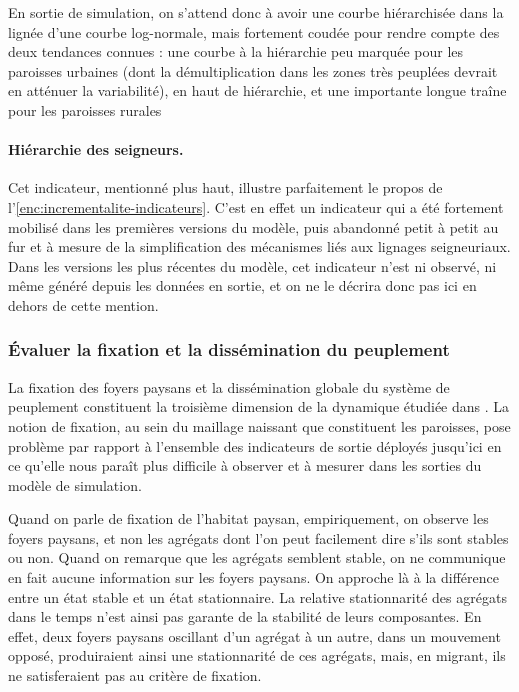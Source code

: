 En sortie de simulation, on s'attend donc à avoir une courbe hiérarchisée dans la lignée d'une courbe log-normale, mais fortement \og coudée\fg{} pour rendre compte des deux tendances connues :
	une courbe à la hiérarchie peu marquée pour les paroisses urbaines (dont la démultiplication dans les zones très peuplées devrait en atténuer la variabilité), en haut de hiérarchie, et une importante \og longue traîne\fg{} pour les paroisses \og rurales\fg{}

\paragraph{Hiérarchie des seigneurs.}
Cet indicateur, mentionné plus haut, illustre parfaitement le propos de l'\cref{enc:incrementalite-indicateurs}.
C'est en effet un indicateur qui a été fortement mobilisé dans les premières versions du modèle, puis abandonné petit à petit au fur et à mesure de la simplification des mécanismes liés aux lignages seigneuriaux.
Dans les versions les plus récentes du modèle, cet indicateur n'est ni observé, ni même généré depuis les données en sortie, et on ne le décrira donc pas ici en dehors de cette mention.

\subsubsection{Évaluer la fixation et la dissémination du peuplement}

La fixation des foyers paysans et la dissémination globale du système de peuplement constituent la troisième dimension de la dynamique étudiée dans \simfeodal{}.
La notion de fixation, au sein du maillage naissant que constituent les paroisses, pose problème par rapport à l'ensemble des indicateurs de sortie déployés jusqu'ici en ce qu'elle nous paraît plus difficile à observer et à mesurer dans les sorties du modèle de simulation.

Quand on parle de fixation de l'habitat paysan, empiriquement, on observe les foyers paysans, et non les agrégats dont l'on peut facilement dire s'ils sont stables ou non.
Quand on remarque que les agrégats semblent stable, on ne communique en fait aucune information sur les foyers paysans.
On approche là à la différence entre un état stable et un état stationnaire.
La relative stationnarité des agrégats dans le temps n'est ainsi pas garante de la stabilité de leurs composantes.
En effet, deux foyers paysans oscillant d'un agrégat à un autre, dans un mouvement opposé, produiraient ainsi une stationnarité de ces agrégats, mais, en migrant, ils ne satisferaient pas au critère de fixation.

